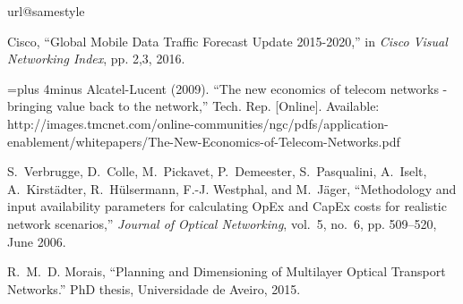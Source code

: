{}
%
\renewcommand{\bibname}{References}
%
%
%
%
\begin{thebibliography}{10}
\providecommand{\url}[1]{#1}
\csname url@samestyle\endcsname
\providecommand{\newblock}{\relax}
\providecommand{\bibinfo}[2]{#2}
\providecommand{\BIBentrySTDinterwordspacing}{\spaceskip=0pt\relax}
\providecommand{\BIBentryALTinterwordstretchfactor}{4}
\providecommand{\BIBentryALTinterwordspacing}{\spaceskip=\fontdimen2\font plus
\BIBentryALTinterwordstretchfactor\fontdimen3\font minus
  \fontdimen4\font\relax}
\providecommand{\BIBforeignlanguage}[2]{{%
\expandafter\ifx\csname l@#1\endcsname\relax
\typeout{** WARNING: IEEEtran.bst: No hyphenation pattern has been}%
\typeout{** loaded for the language `#1'. Using the pattern for}%
\typeout{** the default language instead.}%
\else
\language=\csname l@#1\endcsname
\fi
#2}}
\providecommand{\BIBdecl}{\relax}
\BIBdecl

Cisco, ``Global Mobile Data Traffic Forecast Update 2015-2020,'' in \emph{Cisco Visual Networking Index}, pp. 2,3, 2016.

\BIBentryALTinterwordspacing
Alcatel-Lucent (2009). ``The new economics of telecom networks - bringing value back to the network,'' Tech. Rep. [Online]. Available:
  \url{http://images.tmcnet.com/online-communities/ngc/pdfs/application-enablement/whitepapers/The-New-Economics-of-Telecom-Networks.pdf}
\BIBentrySTDinterwordspacing

S.~Verbrugge, D.~Colle, M.~Pickavet, P.~Demeester, S.~Pasqualini, A.~Iselt, A.~Kirst\"{a}dter, R.~H\"{u}lsermann, F.-J. Westphal, and M.~J\"{a}ger, ``Methodology and input availability parameters for calculating OpEx and CapEx costs for realistic network scenarios,'' \emph{Journal of Optical Networking}, vol.~5, no.~6, pp. 509--520, June 2006.

R.~M.~D. Morais, ``Planning and Dimensioning of Multilayer Optical Transport Networks.'' PhD thesis, Universidade de Aveiro, 2015.

\end{thebibliography}
